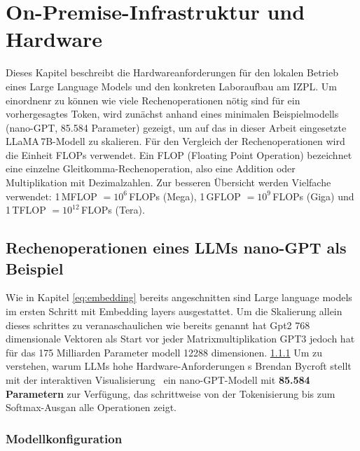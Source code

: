\chapter{On-Premise-Infrastruktur und Hardware}

Dieses Kapitel beschreibt die Hardwareanforderungen für den lokalen Betrieb
eines Large Language Models und den konkreten Laboraufbau am IZPL.
Um einordnenr zu können wie viele Rechenoperationen nötig sind für 
ein vorhergesagtes Token, wird zunächst anhand eines minimalen Beispielmodells
(nano-GPT, 85.584 Parameter) gezeigt, um auf das
in dieser Arbeit eingesetzte LLaMA\,7B-Modell zu skalieren.
Für den Vergleich der Rechenoperationen wird die Einheit FLOPs verwendet.
Ein FLOP (Floating Point Operation) bezeichnet eine einzelne Gleitkomma-Rechenoperation, also eine Addition oder Multiplikation mit Dezimalzahlen. Zur besseren Übersicht werden Vielfache verwendet: 1\,MFLOP $= 10^6$\,FLOPs (Mega), 1\,GFLOP $= 10^9$\,FLOPs (Giga) und 1\,TFLOP $= 10^{12}$\,FLOPs (Tera).
\section{Rechenoperationen eines LLMs nano-GPT als Beispiel}
\label{sec:rechenoperationen}
Wie in Kapitel \ref{eq:embedding} bereits angeschnitten sind Large language models im ersten Schritt mit Embedding layers ausgestattet. Um die Skalierung allein dieses schrittes zu veranaschaulichen wie bereits genannt hat Gpt2 768 dimensionale Vektoren als Start vor jeder Matrixmultiplikation GPT3 jedoch hat für das 175 Milliarden Parameter modell 12288 dimensionen. \ref{}
Um zu verstehen, warum LLMs hohe Hardware-Anforderungen s Brendan Bycroft stellt mit der interaktiven
Visualisierung~\cite{bycroft_llm} ein nano-GPT-Modell mit
\textbf{85.584 Parametern} zur Verfügung, das schrittweise von der Tokenisierung bis zum Softmax-Ausgan alle Operationen zeigt.

\subsection{Modellkonfiguration}

